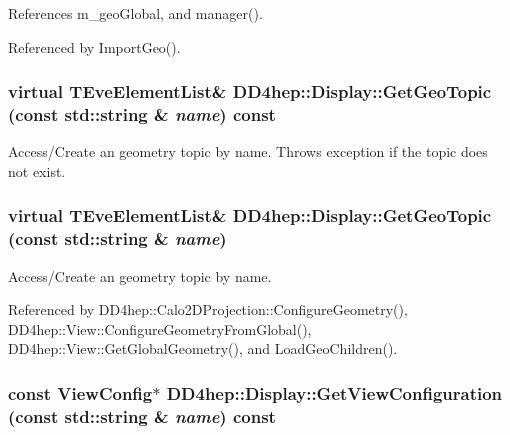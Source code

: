 References m\_\-geoGlobal, and manager().

Referenced by ImportGeo().\hypertarget{class_d_d4hep_1_1_display_a4c0c974d99145c60440d2f0c06573f5b}{
\subsubsection[{GetGeoTopic}]{\setlength{\rightskip}{0pt plus 5cm}virtual {\bf TEveElementList}\& DD4hep::Display::GetGeoTopic (const std::string \& {\em name}) const}}
\label{class_d_d4hep_1_1_display_a4c0c974d99145c60440d2f0c06573f5b}


Access/Create an geometry topic by name. Throws exception if the topic does not exist. \hypertarget{class_d_d4hep_1_1_display_af82081597a063fe0752996338919395e}{
\subsubsection[{GetGeoTopic}]{\setlength{\rightskip}{0pt plus 5cm}virtual {\bf TEveElementList}\& DD4hep::Display::GetGeoTopic (const std::string \& {\em name})}}
\label{class_d_d4hep_1_1_display_af82081597a063fe0752996338919395e}


Access/Create an geometry topic by name. 

Referenced by DD4hep::Calo2DProjection::ConfigureGeometry(), DD4hep::View::ConfigureGeometryFromGlobal(), DD4hep::View::GetGlobalGeometry(), and LoadGeoChildren().\hypertarget{class_d_d4hep_1_1_display_a7e9a8e14da11c617536de4bf4a50ca71}{
\subsubsection[{GetViewConfiguration}]{\setlength{\rightskip}{0pt plus 5cm}const {\bf ViewConfig}$\ast$ DD4hep::Display::GetViewConfiguration (const std::string \& {\em name}) const}}
\label{class_d_d4hep_1_1_display_a7e9a8e14da11c617536de4bf4a50ca71}


